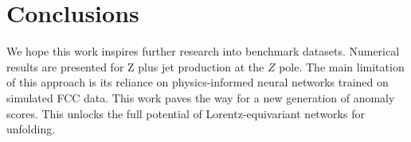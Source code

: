 \section{Conclusions}\label{sec:conclusions}

We hope this work inspires further research into benchmark datasets.
Numerical results are presented for Z plus jet production at the $Z$
pole. The main limitation of this approach is its reliance on
physics-informed neural networks trained on simulated FCC data. This
work paves the way for a new generation of anomaly scores. This unlocks
the full potential of Lorentz-equivariant networks for unfolding.

